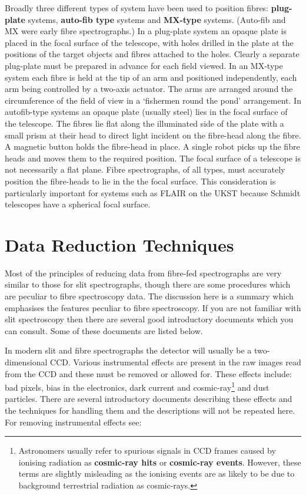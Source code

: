 \documentclass[twoside,11pt]{article}
\newcommand{\xlabel}[1]{}
\begin{document}
Broadly three different types of system have been used to position
fibres: {\bf plug-plate} systems, {\bf auto-fib type} systems and
{\bf MX-type} systems.  (Auto-fib and MX were early fibre spectrographs.)
In a plug-plate system an opaque plate is placed in the focal surface
of the telescope, with holes drilled in the plate at the
positions of the target objects and fibres attached to the holes.
Clearly a separate plug-plate must be prepared in advance for each
field viewed.  In an MX-type system each fibre is held at the tip of an
arm and positioned independently, each arm being controlled by a
two-axis actuator.  The arms are arranged around the circumference
of the field of view in a `fishermen round the pond' arrangement.
In autofib-type systems an opaque plate (usually steel) lies in
the focal surface of the telescope.  The fibres lie flat along the
illuminated side of the plate with a small prism at their head to
direct light incident on the fibre-head along the fibre.  A magnetic
button holds the fibre-head in place.  A single robot picks up the
fibre heads and moves them to the required position.  The focal
surface of a telescope is not necessarily a flat plane.  Fibre
spectrographs, of all types, must accurately position the fibre-heads
to lie in the the focal surface.  This consideration is particularly
important for systems such as FLAIR on the UKST because Schmidt
telescopes have a spherical focal surface.


\section{\xlabel{REDTECH}\label{REDTECH}Data Reduction Techniques}

Most of the principles of reducing data from fibre-fed spectrographs
are very similar to those for slit spectrographs, though there are
some procedures which are peculiar to fibre spectroscopy data.  The
discussion here is a summary which emphasises the features peculiar to
fibre spectroscopy.  If you are not familiar with slit spectroscopy
then there are several good introductory documents which you can
consult.  Some of these documents are listed below.

In modern slit and fibre spectrographs the detector will usually be a
two-dimensional CCD.  Various instrumental effects are present in the
raw images read from the CCD and these must be removed or allowed for.
These effects include: bad pixels, bias in the electronics, dark current
and cosmic-ray\footnote{Astronomers usually refer to spurious signals
in CCD frames caused by ionising radiation as {\bf cosmic-ray hits} or
{\bf cosmic-ray events}.  However, these terms are slightly misleading
as the ionising events are as likely to be due to background
terrestrial radiation as cosmic-rays.} and dust particles.  There are
several introductory documents describing these effects and the techniques
for handling them and the descriptions will not be repeated here.  For
removing instrumental effects see:
\end{document}
